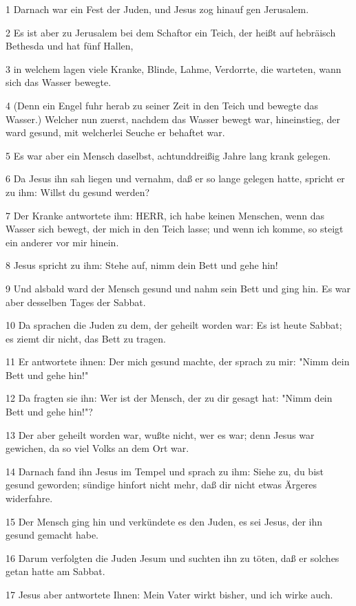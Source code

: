 \par 1 Darnach war ein Fest der Juden, und Jesus zog hinauf gen Jerusalem.
\par 2 Es ist aber zu Jerusalem bei dem Schaftor ein Teich, der heißt auf hebräisch Bethesda und hat fünf Hallen,
\par 3 in welchem lagen viele Kranke, Blinde, Lahme, Verdorrte, die warteten, wann sich das Wasser bewegte.
\par 4 (Denn ein Engel fuhr herab zu seiner Zeit in den Teich und bewegte das Wasser.) Welcher nun zuerst, nachdem das Wasser bewegt war, hineinstieg, der ward gesund, mit welcherlei Seuche er behaftet war.
\par 5 Es war aber ein Mensch daselbst, achtunddreißig Jahre lang krank gelegen.
\par 6 Da Jesus ihn sah liegen und vernahm, daß er so lange gelegen hatte, spricht er zu ihm: Willst du gesund werden?
\par 7 Der Kranke antwortete ihm: HERR, ich habe keinen Menschen, wenn das Wasser sich bewegt, der mich in den Teich lasse; und wenn ich komme, so steigt ein anderer vor mir hinein.
\par 8 Jesus spricht zu ihm: Stehe auf, nimm dein Bett und gehe hin!
\par 9 Und alsbald ward der Mensch gesund und nahm sein Bett und ging hin. Es war aber desselben Tages der Sabbat.
\par 10 Da sprachen die Juden zu dem, der geheilt worden war: Es ist heute Sabbat; es ziemt dir nicht, das Bett zu tragen.
\par 11 Er antwortete ihnen: Der mich gesund machte, der sprach zu mir: "Nimm dein Bett und gehe hin!"
\par 12 Da fragten sie ihn: Wer ist der Mensch, der zu dir gesagt hat: "Nimm dein Bett und gehe hin!"?
\par 13 Der aber geheilt worden war, wußte nicht, wer es war; denn Jesus war gewichen, da so viel Volks an dem Ort war.
\par 14 Darnach fand ihn Jesus im Tempel und sprach zu ihm: Siehe zu, du bist gesund geworden; sündige hinfort nicht mehr, daß dir nicht etwas Ärgeres widerfahre.
\par 15 Der Mensch ging hin und verkündete es den Juden, es sei Jesus, der ihn gesund gemacht habe.
\par 16 Darum verfolgten die Juden Jesum und suchten ihn zu töten, daß er solches getan hatte am Sabbat.
\par 17 Jesus aber antwortete Ihnen: Mein Vater wirkt bisher, und ich wirke auch.
